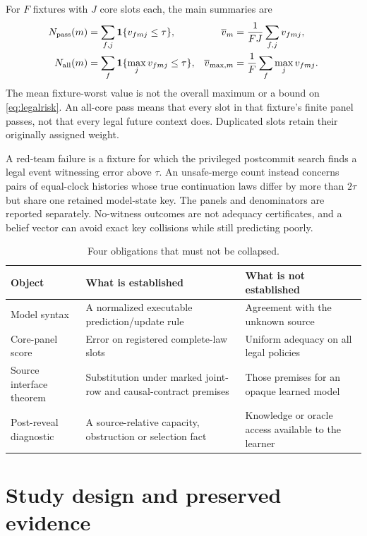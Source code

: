For $F$ fixtures with $J$ core slots each, the main summaries are
\begin{align}
 N_{\mathrm{pass}}(m)&=\sum_{f,j}\mathbf 1\{v_{fmj}\leq\tau\},&
 \overline v_m&=\frac1{FJ}\sum_{f,j}v_{fmj},\label{eq:metrics1}\\
 N_{\mathrm{all}}(m)&=\sum_f\mathbf 1\{\max_jv_{fmj}\leq\tau\},&
 \overline v_{\max,m}&=\frac1F\sum_f\max_jv_{fmj}.\label{eq:metrics2}
\end{align}
The mean fixture-worst value is not the overall maximum or a bound on \cref{eq:legalrisk}. An all-core pass means that every slot in that fixture's finite panel passes, not that every legal future context does. Duplicated slots retain their originally assigned weight.

A red-team failure is a fixture for which the privileged postcommit search finds a legal event witnessing error above $\tau$. An unsafe-merge count instead concerns pairs of equal-clock histories whose true continuation laws differ by more than $2\tau$ but share one retained model-state key. The panels and denominators are reported separately. No-witness outcomes are not adequacy certificates, and a belief vector can avoid exact key collisions while still predicting poorly.

\begin{table}[tbp]
\centering\caption{Four obligations that must not be collapsed.}\label{tab:obligations}
\small\begin{tabularx}{\linewidth}{@{}p{.21\linewidth}YY@{}}\toprule
Object & What is established & What is not established\\\midrule
Model syntax & A normalized executable prediction/update rule & Agreement with the unknown source\\
Core-panel score & Error on registered complete-law slots & Uniform adequacy on all legal policies\\
Source interface theorem & Substitution under marked joint-row and causal-contract premises & Those premises for an opaque learned model\\
Post-reveal diagnostic & A source-relative capacity, obstruction or selection fact & Knowledge or oracle access available to the learner\\\bottomrule
\end{tabularx}
\end{table}



\section{Study design and preserved evidence}\label{sec:design}
